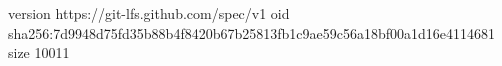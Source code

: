 version https://git-lfs.github.com/spec/v1
oid sha256:7d9948d75fd35b88b4f8420b67b25813fb1c9ae59c56a18bf00a1d16e4114681
size 10011

